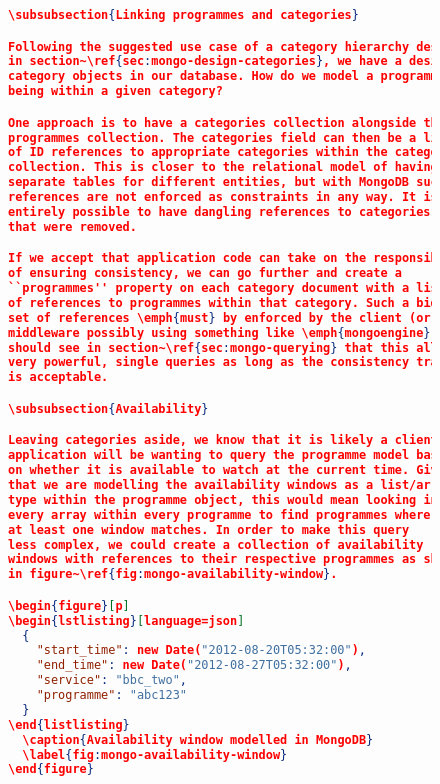 \documentclass[11pt,a4paper]{article}
\begin{document}
\begin{figure}[p]
\begin{lstlisting}[language=json]
\subsubsection{Linking programmes and categories}

Following the suggested use case of a category hierarchy described
in section~\ref{sec:mongo-design-categories}, we have a design for
category objects in our database. How do we model a programme
being within a given category?

One approach is to have a categories collection alongside the
programmes collection. The categories field can then be a list
of ID references to appropriate categories within the categories
collection. This is closer to the relational model of having
separate tables for different entities, but with MongoDB such
references are not enforced as constraints in any way. It is
entirely possible to have dangling references to categories
that were removed.

If we accept that application code can take on the responsibility
of ensuring consistency, we can go further and create a
``programmes'' property on each category document with a list
of references to programmes within that category. Such a bidirectional
set of references \emph{must} by enforced by the client (or bespoke
middleware possibly using something like \emph{mongoengine}). We
should see in section~\ref{sec:mongo-querying} that this allows for
very powerful, single queries as long as the consistency trade-off
is acceptable.

\subsubsection{Availability}

Leaving categories aside, we know that it is likely a client
application will be wanting to query the programme model based
on whether it is available to watch at the current time. Given
that we are modelling the availability windows as a list/array
type within the programme object, this would mean looking inside
every array within every programme to find programmes where
at least one window matches. In order to make this query
less complex, we could create a collection of availability
windows with references to their respective programmes as shown
in figure~\ref{fig:mongo-availability-window}.

\begin{figure}[p]
\begin{lstlisting}[language=json]
  {
    "start_time": new Date("2012-08-20T05:32:00"),
    "end_time": new Date("2012-08-27T05:32:00"),
    "service": "bbc_two",
    "programme": "abc123"
  }
\end{listlisting}
  \caption{Availability window modelled in MongoDB}
  \label{fig:mongo-availability-window}
\end{figure}


\end{lstlisting}
\end{figure}
\end{document}
